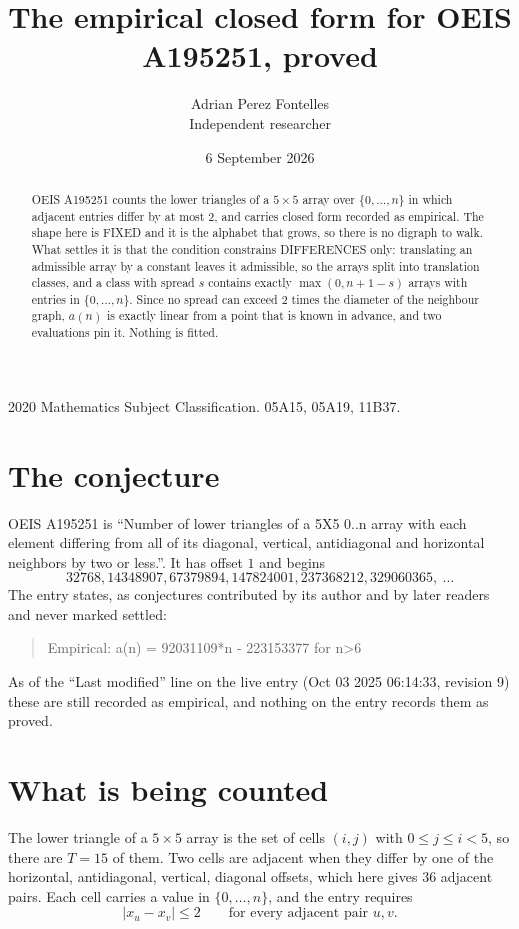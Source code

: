 \documentclass[11pt,a4paper]{article}
\title{The empirical closed form for OEIS A195251, proved}
\author{Adrian Perez Fontelles\\ \small Independent researcher}
\date{6 September 2026}
\theoremstyle{plain}
\theoremstyle{definition}
\begin{document}
\maketitle

\begin{abstract}
OEIS A195251 counts the lower triangles of a $5\times5$ array over $\{0,\dots,n\}$ in which
adjacent entries differ by at most $2$, and carries closed form recorded as empirical. The shape here is FIXED
and it is the alphabet that grows, so there is no digraph to walk. What settles it is that the
condition constrains DIFFERENCES only: translating an admissible array by a constant leaves it
admissible, so the arrays split into translation classes, and a class with spread $s$ contains
exactly $\max(0,n+1-s)$ arrays with entries in $\{0,\dots,n\}$. Since no spread can exceed
$2$ times the diameter of the neighbour graph, $a(n)$ is exactly linear from a point that is
known in advance, and two evaluations pin it. Nothing is fitted.
\end{abstract}

\noindent\small 2020 Mathematics Subject Classification. 05A15, 05A19, 11B37.\normalsize

\section{The conjecture}

OEIS A195251 is ``Number of lower triangles of a 5X5 0..n array with each element differing from all of its diagonal, vertical, antidiagonal and horizontal neighbors by two or less.''. It has offset $1$ and begins
\[
32768, 14348907, 67379894, 147824001, 237368212, 329060365,\ \dots
\]
The entry states, as conjectures contributed by its author and by later readers and never
marked settled:
\begin{quote}
Empirical: a(n) = 92031109*n - 223153377 for n>6
\end{quote}
As of the ``Last modified'' line on the live entry (Oct 03 2025 06:14:33, revision 9) these are still
recorded as empirical, and nothing on the entry records them as proved.

\section{What is being counted}

The lower triangle of a $5\times5$ array is the set of cells $(i,j)$ with $0\le j\le
i<5$, so there are $T=15$ of them. Two cells are adjacent when they differ by one of the
horizontal, antidiagonal, vertical, diagonal offsets, which here gives $36$ adjacent pairs. Each cell carries a value in
$\{0,\dots,n\}$, and the entry requires
\[
|x_u-x_v|\le 2\qquad\text{for every adjacent pair }u,v .
\]
\end{document}
